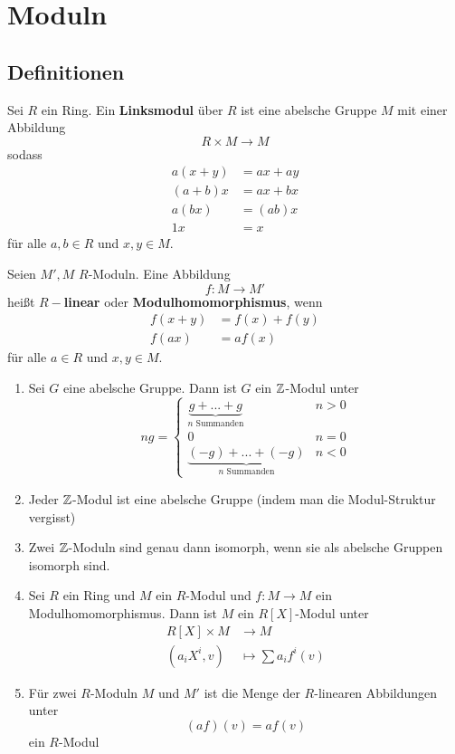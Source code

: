 	\section{Moduln}
	\subsection{Definitionen}
	\begin{definition}
		Sei $R$ ein Ring. Ein \textbf{Linksmodul} über $R$ ist eine abelsche Gruppe $M$ mit einer Abbildung
		\[R\times M\to M\]
		sodass
		\begin{align*}
		a(x+y)&=ax+ay\\
		(a+b)x&=ax+bx\\
		a(bx)&=(ab)x\\
		1x&=x
		\end{align*}
		für alle $a,b\in R$ und $x,y\in M$.
	\end{definition}

	\begin{definition}
		Seien $M',M$ $R$-Moduln. Eine Abbildung
		\[f:M\to M'\]
		heißt \textbf{$R-$linear} oder \textbf{Modulhomomorphismus}, wenn
		\begin{align*}
		f(x+y)&=f(x)+f(y)\\
		f(ax)&=af(x)
		\end{align*}
		für alle $a\in R$ und $x,y\in M$.
	\end{definition}

	\begin{exm}
		\begin{enumerate}
			\item Sei $G$ eine abelsche Gruppe. Dann ist $G$ ein $\mathbb{Z}$-Modul unter
			\[ng=\begin{cases}
			\underbrace{g+...+g}_{\text{$n$ Summanden}}&n>0\\
			0&n=0\\
			\underbrace{(-g)+...+(-g)}_{\text{$n$ Summanden}}&n<0
			\end{cases}\]
			\item Jeder $\mathbb{Z}$-Modul ist eine abelsche Gruppe (indem man die Modul-Struktur vergisst)
			\item Zwei $\mathbb{Z}$-Moduln sind genau dann isomorph, wenn sie als abelsche Gruppen isomorph sind.
			\item Sei $R$ ein Ring und $M$ ein $R$-Modul und $f:M\to M$ ein Modulhomomorphismus. Dann ist $M$ ein $R[X]$-Modul unter
			\begin{align*}
			R[X]\times M&\to M\\
			\left(a_iX^i,v\right)&\mapsto\sum a_if^i(v)
			\end{align*}
			\item Für zwei $R$-Moduln $M$ und $M'$ ist die Menge der $R$-linearen Abbildungen unter
			\[(a f)(v)=af(v)\]
			ein $R$-Modul
		\end{enumerate}
	\end{exm}

